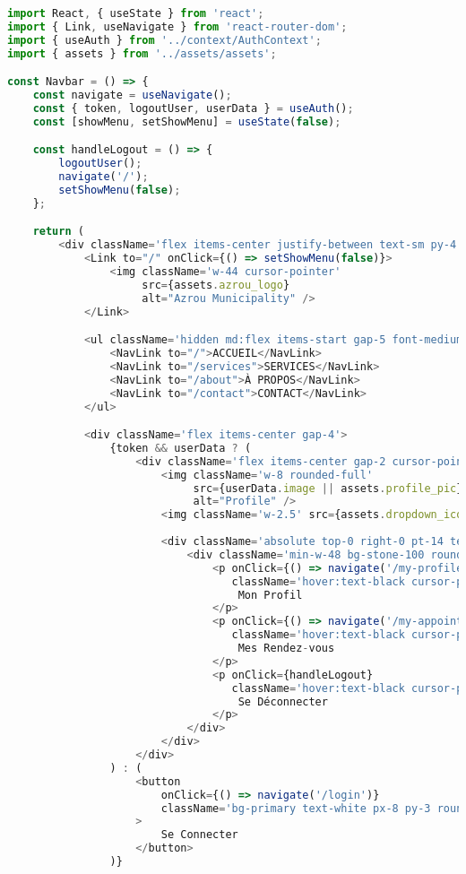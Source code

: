 \begin{lstlisting}[language=JavaScript, caption=Navbar.jsx avec menu mobile]
import React, { useState } from 'react';
import { Link, useNavigate } from 'react-router-dom';
import { useAuth } from '../context/AuthContext';
import { assets } from '../assets/assets';

const Navbar = () => {
    const navigate = useNavigate();
    const { token, logoutUser, userData } = useAuth();
    const [showMenu, setShowMenu] = useState(false);

    const handleLogout = () => {
        logoutUser();
        navigate('/');
        setShowMenu(false);
    };

    return (
        <div className='flex items-center justify-between text-sm py-4 mb-5 border-b border-b-gray-400'>
            <Link to="/" onClick={() => setShowMenu(false)}>
                <img className='w-44 cursor-pointer' 
                     src={assets.azrou_logo} 
                     alt="Azrou Municipality" />
            </Link>

            <ul className='hidden md:flex items-start gap-5 font-medium'>
                <NavLink to="/">ACCUEIL</NavLink>
                <NavLink to="/services">SERVICES</NavLink>
                <NavLink to="/about">À PROPOS</NavLink>
                <NavLink to="/contact">CONTACT</NavLink>
            </ul>

            <div className='flex items-center gap-4'>
                {token && userData ? (
                    <div className='flex items-center gap-2 cursor-pointer group relative'>
                        <img className='w-8 rounded-full' 
                             src={userData.image || assets.profile_pic} 
                             alt="Profile" />
                        <img className='w-2.5' src={assets.dropdown_icon} alt="" />
                        
                        <div className='absolute top-0 right-0 pt-14 text-base font-medium text-gray-600 z-20 hidden group-hover:block'>
                            <div className='min-w-48 bg-stone-100 rounded flex flex-col gap-4 p-4'>
                                <p onClick={() => navigate('/my-profile')} 
                                   className='hover:text-black cursor-pointer'>
                                    Mon Profil
                                </p>
                                <p onClick={() => navigate('/my-appointments')} 
                                   className='hover:text-black cursor-pointer'>
                                    Mes Rendez-vous
                                </p>
                                <p onClick={handleLogout} 
                                   className='hover:text-black cursor-pointer'>
                                    Se Déconnecter
                                </p>
                            </div>
                        </div>
                    </div>
                ) : (
                    <button 
                        onClick={() => navigate('/login')}
                        className='bg-primary text-white px-8 py-3 rounded-full font-light hidden md:block'
                    >
                        Se Connecter
                    </button>
                )}


\end{lstlisting}
